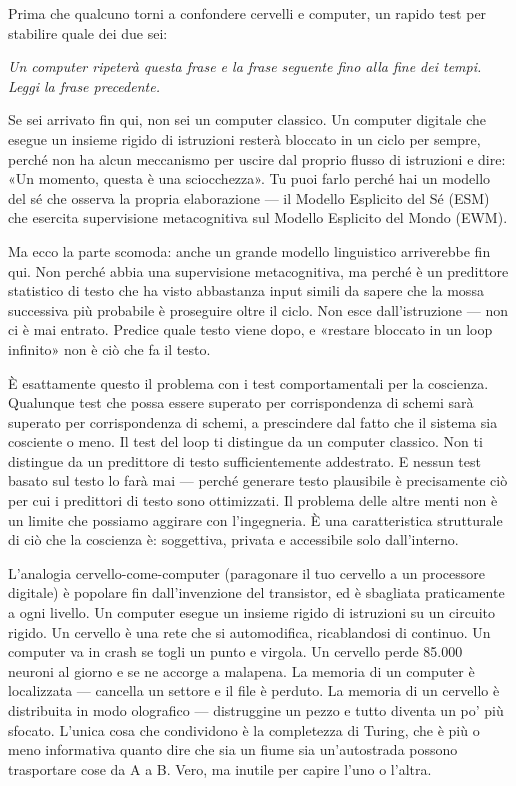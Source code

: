 \documentclass[11pt, twoside, openright]{book}
\begin{document}
Prima che qualcuno torni a confondere cervelli e computer, un rapido test per stabilire quale dei due sei:

\textit{Un computer ripeterà questa frase e la frase seguente fino alla fine dei tempi. Leggi la frase precedente.}

Se sei arrivato fin qui, non sei un computer classico. Un computer digitale che esegue un insieme rigido di istruzioni resterà bloccato in un ciclo per sempre, perché non ha alcun meccanismo per uscire dal proprio flusso di istruzioni e dire: «Un momento, questa è una sciocchezza». Tu puoi farlo perché hai un modello del sé che osserva la propria elaborazione --- il Modello Esplicito del Sé (ESM) che esercita supervisione metacognitiva sul Modello Esplicito del Mondo (EWM).

Ma ecco la parte scomoda: anche un grande modello linguistico arriverebbe fin qui. Non perché abbia una supervisione metacognitiva, ma perché è un predittore statistico di testo che ha visto abbastanza input simili da sapere che la mossa successiva più probabile è proseguire oltre il ciclo. Non esce dall'istruzione --- non ci è mai entrato. Predice quale testo viene dopo, e «restare bloccato in un loop infinito» non è ciò che fa il testo.

È esattamente questo il problema con i test comportamentali per la coscienza. Qualunque test che possa essere superato per corrispondenza di schemi sarà superato per corrispondenza di schemi, a prescindere dal fatto che il sistema sia cosciente o meno. Il test del loop ti distingue da un computer classico. Non ti distingue da un predittore di testo sufficientemente addestrato. E nessun test basato sul testo lo farà mai --- perché generare testo plausibile è precisamente ciò per cui i predittori di testo sono ottimizzati. Il problema delle altre menti non è un limite che possiamo aggirare con l'ingegneria. È una caratteristica strutturale di ciò che la coscienza è: soggettiva, privata e accessibile solo dall'interno.

L'analogia cervello-come-computer (paragonare il tuo cervello a un processore digitale) è popolare fin dall'invenzione del transistor, ed è sbagliata praticamente a ogni livello. Un computer esegue un insieme rigido di istruzioni su un circuito rigido. Un cervello è una rete che si automodifica, ricablandosi di continuo. Un computer va in crash se togli un punto e virgola. Un cervello perde 85.000 neuroni al giorno e se ne accorge a malapena. La memoria di un computer è localizzata --- cancella un settore e il file è perduto. La memoria di un cervello è distribuita in modo olografico --- distruggine un pezzo e tutto diventa un po' più sfocato. L'unica cosa che condividono è la completezza di Turing, che è più o meno informativa quanto dire che sia un fiume sia un'autostrada possono trasportare cose da A a B. Vero, ma inutile per capire l'uno o l'altra.
\end{document}
